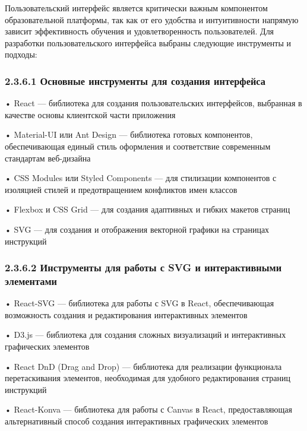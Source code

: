 \subtitlespace

{\gostFont

  \par \redline Пользовательский интерфейс является критически важным компонентом образовательной платформы, так как от его удобства и интуитивности напрямую зависит эффективность обучения и удовлетворенность пользователей. Для разработки пользовательского интерфейса выбраны следующие инструменты и подходы:

  \subsubsection*{2.3.6.1 Основные инструменты для создания интерфейса}

  \par \redline • React — библиотека для создания пользовательских интерфейсов, выбранная в качестве основы клиентской части приложения
  \par \redline • Material-UI или Ant Design — библиотека готовых компонентов, обеспечивающая единый стиль оформления и соответствие современным стандартам веб-дизайна
  \par \redline • CSS Modules или Styled Components — для стилизации компонентов с изоляцией стилей и предотвращением конфликтов имен классов
  \par \redline • Flexbox и CSS Grid — для создания адаптивных и гибких макетов страниц
  \par \redline • SVG — для создания и отображения векторной графики на страницах инструкций

  \subsubsection*{2.3.6.2 Инструменты для работы с SVG и интерактивными элементами}

  \par \redline • React-SVG — библиотека для работы с SVG в React, обеспечивающая возможность создания и редактирования интерактивных элементов
  \par \redline • D3.js — библиотека для создания сложных визуализаций и интерактивных графических элементов
  \par \redline • React DnD (Drag and Drop) — библиотека для реализации функционала перетаскивания элементов, необходимая для удобного редактирования страниц инструкций
  \par \redline • React-Konva — библиотека для работы с Canvas в React, предоставляющая альтернативный способ создания интерактивных графических элементов

}
